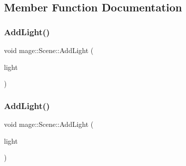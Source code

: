 \subsection{Member Function Documentation}
\hypertarget{classmage_1_1_scene_a6ce8182afe3c1f39249ec08b62aee317}{}\label{classmage_1_1_scene_a6ce8182afe3c1f39249ec08b62aee317} 
\subsubsection{\texorpdfstring{Add\+Light()}{AddLight()}\hspace{0.1cm}{\footnotesize\ttfamily [1/2]}}
{\footnotesize\ttfamily void mage\+::\+Scene\+::\+Add\+Light (\begin{DoxyParamCaption}\item[{\hyperlink{namespacemage_a1e01ae66713838a7a67d30e44c67703e}{Shared\+Ptr}$<$ \hyperlink{namespacemage_a1724c6e6b6b5ba535cdd967cbbb4a669}{Omni\+Light\+Node} $>$}]{light }\end{DoxyParamCaption})\hspace{0.3cm}{\ttfamily [private]}}

\hypertarget{classmage_1_1_scene_aeeba74ee789d4917ed72b179f16c1222}{}\label{classmage_1_1_scene_aeeba74ee789d4917ed72b179f16c1222} 
\subsubsection{\texorpdfstring{Add\+Light()}{AddLight()}\hspace{0.1cm}{\footnotesize\ttfamily [2/2]}}
{\footnotesize\ttfamily void mage\+::\+Scene\+::\+Add\+Light (\begin{DoxyParamCaption}\item[{\hyperlink{namespacemage_a1e01ae66713838a7a67d30e44c67703e}{Shared\+Ptr}$<$ \hyperlink{namespacemage_aeed5dee4ff6c591eabb0e9114256df4a}{Spot\+Light\+Node} $>$}]{light }\end{DoxyParamCaption})\hspace{0.3cm}{\ttfamily [private]}}

\hypertarget{classmage_1_1_scene_acfd5cf0484e1814cb265604ed970335f}{}\label{classmage_1_1_scene_acfd5cf0484e1814cb265604ed970335f} 
